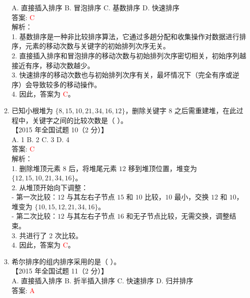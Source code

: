 \documentclass[lang=cn,newtx,10pt,scheme=chinese]{../../../elegantbook}
\begin{document}
\begin{enumerate}
    A. 直接插入排序 \quad B. 冒泡排序 \quad C. 基数排序 \quad D. 快速排序 \\

    答案: \textcolor{red}{C} \\

    解析：\\
    1. 基数排序是一种非比较排序算法，它通过多趟分配和收集操作对数据进行排序，元素的移动次数与关键字的初始排列次序无关。\\
    2. 直接插入排序和冒泡排序的移动次数与初始排列次序密切相关，初始序列越接近有序，移动次数越少。\\
    3. 快速排序的移动次数也与初始排列次序有关，最坏情况下（完全有序或逆序）会导致较多的移动操作。\\
    4. 因此，答案为 \textcolor{red}{C}。\\ 
    \item 已知小根堆为 $\{8, 15, 10, 21, 34, 16, 12\}$，删除关键字 8 之后需重建堆，在此过程中，关键字之间的比较次数是（ ）。\\
    【2015 年全国试题 10（2 分）】\\

    A. 1 \quad B. 2 \quad C. 3 \quad D. 4 \\

    答案: \textcolor{red}{C} \\

    解析：\\
    1. 删除堆顶元素 $8$ 后，将堆尾元素 $12$ 移到堆顶位置，堆变为 $\{12, 15, 10, 21, 34, 16\}$。\\
    2. 从堆顶开始向下调整：\\
       - 第一次比较：$12$ 与其左右子节点 $15$ 和 $10$ 比较，$10$ 最小，交换 $12$ 和 $10$，堆变为 $\{10, 15, 12, 21, 34, 16\}$。\\
       - 第二次比较：$12$ 与其左右子节点 $16$ 和无子节点比较，无需交换，调整结束。\\
    3. 共进行了 2 次比较。\\
    4. 因此，答案为 \textcolor{red}{C}。\\  

    \item 希尔排序的组内排序采用的是（ ）。\\
    【2015 年全国试题 11（2 分）】\\

    A. 直接插入排序 \quad B. 折半插入排序 \quad C. 快速排序 \quad D. 归并排序 \\

    答案: \textcolor{red}{A} \\


\end{enumerate}
\end{document}
